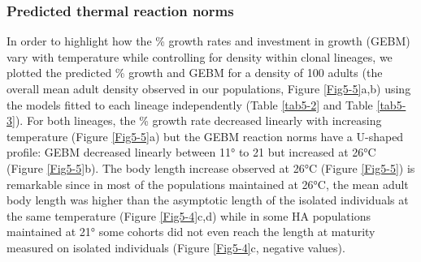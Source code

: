 \subsubsection{Predicted thermal reaction norms}

In order to highlight how the \% growth rates and investment in growth (GEBM)
vary with temperature while controlling for density within clonal lineages, we
plotted the predicted \% growth and GEBM for a density of 100 adults (the
overall mean adult density observed in our populations, Figure \ref{Fig5-5}a,b) using the
models fitted to each lineage independently (Table \ref{tab5-2} and Table
\ref{tab5-3}). For both lineages, the \% growth rate decreased linearly with increasing temperature
(Figure \ref{Fig5-5}a) but the GEBM reaction norms have a U-shaped profile: GEBM decreased
linearly between 11° to 21 but increased at 26°C (Figure \ref{Fig5-5}b). The body length
increase observed at 26°C (Figure \ref{Fig5-5}) is remarkable since in most of the
populations maintained at 26°C, the mean adult body length was higher than the
asymptotic length of the isolated individuals at the same temperature (Figure
\ref{Fig5-4}c,d) while in some HA populations maintained at 21° some cohorts did
not even reach the length at maturity measured on isolated individuals (Figure
\ref{Fig5-4}c, negative values).

